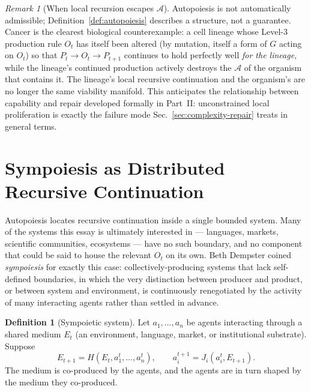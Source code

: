 \documentclass[12pt,a4paper]{article}
\theoremstyle{plain}
\theoremstyle{definition}
\newtheorem{definition}[theorem]{Definition}
\theoremstyle{remark}
\newtheorem{remark}[theorem]{Remark}
\newcommand{\Adm}{\mathcal{A}}
\begin{document}
\begin{remark}[When local recursion escapes $\Adm$]
\label{rem:cancer-preview}
Autopoiesis is not automatically admissible; Definition~\ref{def:autopoiesis} describes a structure, not a guarantee. Cancer is the clearest biological counterexample: a cell lineage whose Level-3 production rule $O_t$ has itself been altered (by mutation, itself a form of $G$ acting on $O_t$) so that $P_t \to O_t \to P_{t+1}$ continues to hold perfectly well \emph{for the lineage}, while the lineage's continued production actively destroys the $\Adm$ of the organism that contains it. The lineage's local recursive continuation and the organism's are no longer the same viability manifold. This anticipates the relationship between capability and repair developed formally in Part~II: unconstrained local proliferation is exactly the failure mode Sec.~\ref{sec:complexity-repair} treats in general terms.
\end{remark}

\section{Sympoiesis as Distributed Recursive Continuation}
\label{sec:sympoiesis}

Autopoiesis locates recursive continuation inside a single bounded system. Many of the systems this essay is ultimately interested in — languages, markets, scientific communities, ecosystems — have no such boundary, and no component that could be said to house the relevant $O_t$ on its own. Beth Dempster coined \emph{sympoiesis} for exactly this case: collectively-producing systems that lack self-defined boundaries, in which the very distinction between producer and product, or between system and environment, is continuously renegotiated by the activity of many interacting agents rather than settled in advance.

\begin{definition}[Sympoietic system]
\label{def:sympoiesis}
Let $a_1, \ldots, a_n$ be agents interacting through a shared medium $E_t$ (an environment, language, market, or institutional substrate). Suppose
\[
E_{t+1} = H(E_t, a_1^t, \ldots, a_n^t), \qquad a_i^{t+1} = J_i(a_i^t, E_{t+1}).
\]
The medium is co-produced by the agents, and the agents are in turn shaped by the medium they co-produced.
\end{definition}
\end{document}
